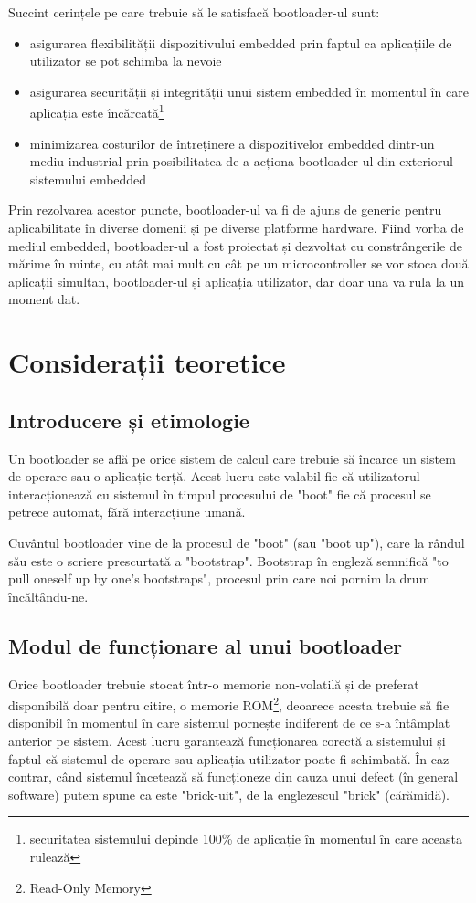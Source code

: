 \documentclass[12pt,a4paper,titlepage]{report}
\begin{document}
Succint cerințele pe care trebuie să le satisfacă bootloader-ul sunt:
\begin{itemize}
\item asigurarea flexibilității dispozitivului embedded prin faptul ca aplicațiile de utilizator se pot schimba la nevoie
\item asigurarea securității și integrității unui sistem embedded în momentul în care aplicația este încărcată\footnote{securitatea sistemului depinde 100\% de aplicație în momentul în care aceasta rulează}
\item minimizarea costurilor de întreținere a dispozitivelor embedded dintr-un mediu industrial prin posibilitatea de a acționa bootloader-ul din exteriorul sistemului embedded
\end{itemize}

Prin rezolvarea acestor puncte, bootloader-ul va fi de ajuns de generic pentru aplicabilitate în diverse domenii și pe diverse platforme hardware. Fiind vorba de mediul embedded, bootloader-ul a fost proiectat și dezvoltat cu constrângerile de mărime în minte, cu atât mai mult cu cât pe un microcontroller se vor stoca două aplicații simultan, bootloader-ul și aplicația utilizator, dar doar una va rula la un moment dat.

\newpage
\chapter{Considerații teoretice}
\section{Introducere și etimologie}
Un bootloader se află pe orice sistem de calcul care trebuie să încarce un sistem de operare sau o aplicație terță.
Acest lucru este valabil fie că utilizatorul interacționează cu sistemul în timpul procesului de "boot" fie că procesul se petrece automat, fără interacțiune umană.

Cuvântul bootloader vine de la procesul de "boot" (sau "boot up"), care la rândul său este o scriere prescurtată a "bootstrap". Bootstrap în engleză semnifică "to pull oneself up by one's bootstraps", procesul prin care noi pornim la drum încălțându-ne. \cite{wikiBootstrap}

\section{Modul de funcționare al unui bootloader}
Orice bootloader trebuie stocat într-o memorie non-volatilă și de preferat disponibilă doar pentru citire, o memorie ROM\footnote{Read-Only Memory}, deoarece acesta trebuie să fie disponibil în momentul în care sistemul pornește indiferent de ce s-a întâmplat anterior pe sistem. Acest lucru garantează funcționarea corectă a sistemului și faptul că sistemul de operare sau aplicația utilizator poate fi schimbată. În caz contrar, când sistemul încetează să funcționeze din cauza unui defect (în general software) putem spune ca este "brick-uit", de la englezescul "brick" (cărămidă)\cite{wikiBrick}.
\end{document}
